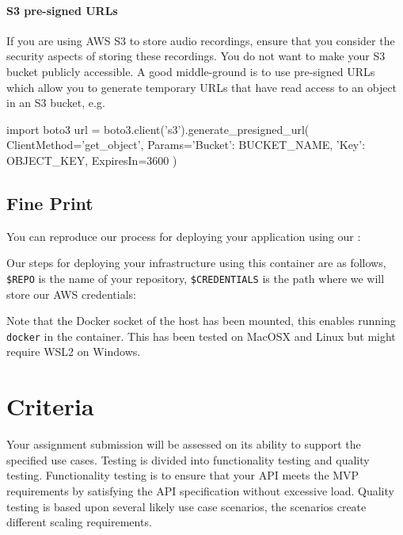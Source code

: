 \documentclass{csse4400}
\begin{document}

\paragraph{S3 pre-signed URLs}
If you are using AWS S3 to store audio recordings,
ensure that you consider the security aspects of storing these recordings.
You do not want to make your S3 bucket publicly accessible.
A good middle-ground is to use pre-signed URLs which allow you to generate temporary URLs that have read access to an object in an S3 bucket, e.g.

\begin{code}[language=python]{}
import boto3
url = boto3.client('s3').generate_presigned_url(
  ClientMethod='get_object', 
  Params={'Bucket': BUCKET_NAME, 'Key': OBJECT_KEY},
  ExpiresIn=3600
)
\end{code}


\subsection{Fine Print}
You can reproduce our process for deploying your application using our :

\noindent
Our steps for deploying your infrastructure using this container are as follows,
\texttt{\$REPO} is the name of your repository,
\texttt{\$CREDENTIALS} is the path where we will store our AWS credentials:

\noindent
Note that the Docker socket of the host has been mounted,
this enables running \texttt{docker} in the container.
This has been tested on MacOSX and Linux but might require WSL2 on Windows.

\section{Criteria}
Your assignment submission will be assessed on its ability to support the specified use cases.
Testing is divided into functionality testing and quality testing.
Functionality testing is to ensure that your API meets the MVP requirements by satisfying the API specification without excessive load.
Quality testing is based upon several likely use case scenarios,
the scenarios create different scaling requirements.
\end{document}
